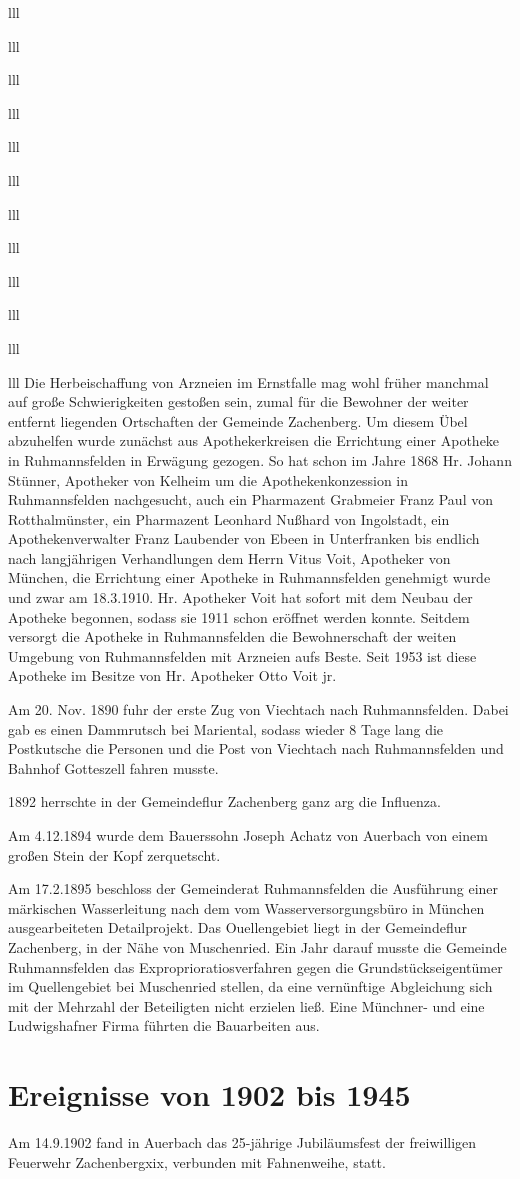 \documentclass[12pt,a4pager]{book}
\begin{document}
\begin{tabuluar}{lll}
\begin{tabuluar}{lll}
\begin{tabuluar}{lll}
\begin{tabuluar}{lll}
\begin{tabuluar}{lll}
\begin{tabuluar}{lll}
\begin{tabuluar}{lll}
\begin{tabuluar}{lll}
\begin{tabuluar}{lll}
\begin{tabuluar}{lll}
\begin{tabuluar}{lll}
\begin{tabuluar}{lll}
Die Herbeischaffung von Arzneien im Ernstfalle mag wohl früher manchmal auf
große Schwierigkeiten gestoßen sein, zumal für die Bewohner der weiter entfernt
liegenden Ortschaften der Gemeinde Zachenberg. Um diesem Übel abzuhelfen wurde
zunächst aus Apothekerkreisen die Errichtung einer Apotheke in Ruhmannsfelden in
Erwägung gezogen. So hat schon im Jahre 1868 Hr. Johann Stünner, Apotheker von
Kelheim um die Apothekenkonzession in Ruhmannsfelden nachgesucht, auch ein
Pharmazent Grabmeier Franz Paul von Rotthalmünster, ein Pharmazent Leonhard
Nußhard von Ingolstadt, ein Apothekenverwalter Franz Laubender von Ebeen in
Unterfranken bis endlich nach langjährigen Verhandlungen dem Herrn Vitus Voit,
Apotheker von München, die Errichtung einer Apotheke in Ruhmannsfelden genehmigt
wurde und zwar am 18.3.1910. Hr. Apotheker Voit hat sofort mit dem Neubau der
Apotheke begonnen, sodass sie 1911 schon eröffnet werden konnte. Seitdem
versorgt die Apotheke in Ruhmannsfelden die Bewohnerschaft der weiten Umgebung
von Ruhmannsfelden mit Arzneien aufs Beste. Seit 1953 ist diese Apotheke im
Besitze von Hr. Apotheker Otto Voit jr.

Am 20. Nov. 1890 fuhr der erste Zug von Viechtach nach Ruhmannsfelden. Dabei gab
es einen Dammrutsch bei Mariental, sodass wieder 8 Tage lang die Postkutsche die
Personen und die Post von Viechtach nach Ruhmannsfelden und Bahnhof Gotteszell
fahren musste.

1892 herrschte in der Gemeindeflur Zachenberg ganz arg die Influenza.

Am 4.12.1894 wurde dem Bauerssohn Joseph Achatz von Auerbach von einem großen
Stein der Kopf zerquetscht.

Am 17.2.1895 beschloss der Gemeinderat Ruhmannsfelden die Ausführung einer
märkischen Wasserleitung nach dem vom Wasserversorgungsbüro in München
ausgearbeiteten Detailprojekt. Das Ouellengebiet liegt in der Gemeindeflur
Zachenberg, in der Nähe von Muschenried. Ein Jahr darauf musste die Gemeinde
Ruhmannsfelden das Exproprioratiosverfahren gegen die Grundstückseigentümer im
Quellengebiet bei Muschenried stellen, da eine vernünftige Abgleichung sich mit
der Mehrzahl der Beteiligten nicht erzielen ließ. Eine Münchner- und eine
Ludwigshafner Firma führten die Bauarbeiten aus.

\section{Ereignisse von 1902 bis 1945}

Am 14.9.1902 fand in Auerbach das 25-jährige Jubiläumsfest der freiwilligen
Feuerwehr Zachenbergxix, verbunden mit Fahnenweihe, statt.


\end{tabuluar}
\end{tabuluar}
\end{tabuluar}
\end{tabuluar}
\end{tabuluar}
\end{tabuluar}
\end{tabuluar}
\end{tabuluar}
\end{tabuluar}
\end{tabuluar}
\end{tabuluar}
\end{tabuluar}
\end{document}

